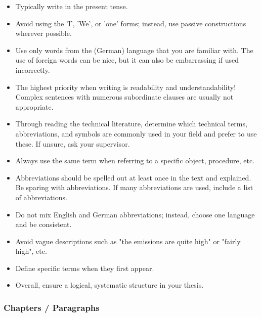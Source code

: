 \documentclass[a4paper, fleqn, headsepline, footsepline, 12pt, parskip=half]{scrartcl}
\begin{document}
\begin{itemize}
    \item Typically write in the present tense.
    \item Avoid using the 'I', 'We', or 'one' forms; instead, use passive constructions wherever possible.
    \item Use only words from the (German) language that you are familiar with. The use of foreign words can be nice, but it can also be embarrassing if used incorrectly.
    \item The highest priority when writing is readability and understandability! Complex sentences with numerous subordinate clauses are usually not appropriate.
    \item Through reading the technical literature, determine which technical terms, abbreviations, and symbols are commonly used in your field and prefer to use these. If unsure, ask your supervisor.
    \item Always use the same term when referring to a specific object, procedure, etc.
    \item Abbreviations should be spelled out at least once in the text and explained. Be sparing with abbreviations. If many abbreviations are used, include a list of abbreviations.
    \item Do not mix English and German abbreviations; instead, choose one language and be consistent.
    \item Avoid vague descriptions such as "the emissions are quite high" or "fairly high", etc.
    \item Define specific terms when they first appear.
    \item Overall, ensure a logical, systematic structure in your thesis.
\end{itemize}


\subsubsection{Chapters / Paragraphs}
\label{sec:chaptersParagraphs}
\end{document}
